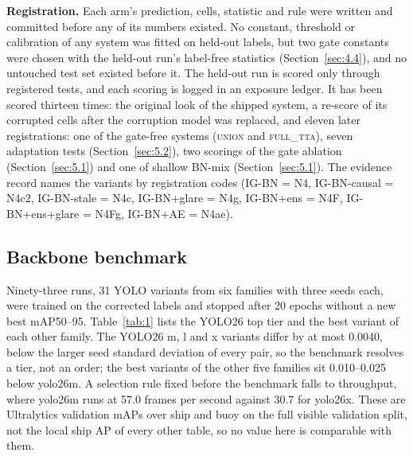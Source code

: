 \documentclass[journal]{IEEEtran}
\begin{document}
\textbf{Registration.} Each arm's prediction, cells, statistic and rule were written and committed before any of its numbers existed. No constant, threshold or calibration of any system was fitted on held-out labels, but two gate constants were chosen with the held-out run's label-free statistics (Section~\ref{sec:4.4}), and no untouched test set existed before it. The held-out run is scored only through registered tests, and each scoring is logged in an exposure ledger. It has been scored thirteen times: the original look of the shipped system, a re-score of its corrupted cells after the corruption model was replaced, and eleven later registrations: one of the gate-free systems (\textsc{union} and \textsc{full\_tta}), seven adaptation tests (Section~\ref{sec:5.2}), two scorings of the gate ablation (Section~\ref{sec:5.1}) and one of shallow BN-mix (Section~\ref{sec:5.1}). The evidence record names the variants by registration codes (\mbox{IG-BN} = N4, \mbox{IG-BN-causal} = N4c2, \mbox{IG-BN-stale} = N4c, \mbox{IG-BN+glare} = N4g, \mbox{IG-BN+ens} = N4F, \mbox{IG-BN+ens+glare} = N4Fg, \mbox{IG-BN+AE} = N4ae).

\subsection{Backbone benchmark}\label{sec:3.5}
Ninety-three runs, 31 YOLO variants from six families with three seeds each, were trained on the corrected labels and stopped after 20 epochs without a new best mAP50--95. Table~\ref{tab:1} lists the YOLO26 top tier and the best variant of each other family. The YOLO26 m, l and x variants differ by at most 0.0040, below the larger seed standard deviation of every pair, so the benchmark resolves a tier, not an order; the best variants of the other five families sit 0.010--0.025 below yolo26m. A selection rule fixed before the benchmark falls to throughput, where yolo26m runs at 57.0 frames per second against 30.7 for yolo26x. These are Ultralytics validation mAPs over ship and buoy on the full visible validation split, not the local ship AP of every other table, so no value here is comparable with them.
\end{document}
